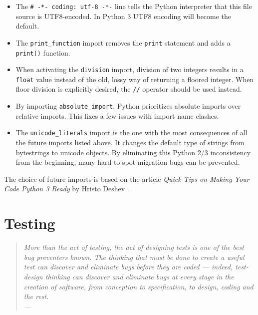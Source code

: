 \begin{itemize}
	\item The \texttt{\# -*- coding: utf-8 -*-} line tells the Python interpreter
		that this file source is UTF8-encoded. In Python 3 UTF8 encoding will become
		the default.
	\item The \texttt{print\_function} import removes the \texttt{print} statement
		and adds a \texttt{print()} function.
	\item When activating the \texttt{division} import, division of two integers
		results in a \texttt{float} value instead of the old, lossy way of returning
		a floored integer. When floor division is explicitly desired, the
		\texttt{//} operator should be used instead.
	\item By importing \texttt{absolute\_import}, Python prioritizes absolute
		imports over relative imports. This fixes a few issues with import name
		clashes.
	\item The \texttt{unicode\_literals} import is the one with the most
		consequences of all the future imports listed above. It changes the default
		type of strings from bytestrings to unicode objects. By eliminating this
		Python 2/3 inconsistency from the beginning, many hard to spot migration
		bugs can be prevented.
\end{itemize}

\noindent The choice of future imports is based on the article \emph{Quick Tips
on Making Your Code Python 3 Ready} by Hristo Deshev \cite{deshev:2012}.


\section{Testing} \label{sec:development:testing}

\begin{quote}{\slshape
More than the act of testing, the act of designing tests is one of the best bug
preventers known. The thinking that must be done to create a useful test can
discover and eliminate bugs before they are coded — indeed, test-design thinking
can discover and eliminate bugs at every stage in the creation of software, from
conception to specification, to design, coding and the rest.\\ \medskip
---  \citep{beizer:2003}
}\end{quote}

